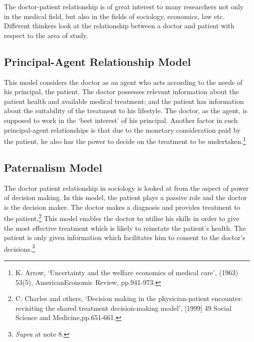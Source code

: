 \begin{multicols}{2}

\noi
The doctor-patient relationship is of great interest to many researchers not only in the
medical field, but also in the fields of sociology, economics, law etc. Different thinkers
look at the relationship between a doctor and patient with respect to the area of study.

\vspace{-.4cm}

\subsection*{Principal-Agent Relationship Model}

\vspace{-.2cm}

\noi
This model considers the doctor as an agent who acts according to the needs of his
principal, the patient. The doctor possesses relevant information about the patient health
and available medical treatment; and the patient has information about the suitability of
the treatment to his lifestyle. The doctor, as the agent, is supposed to work in the ‘best
interest’ of his principal. Another factor in such principal-agent relationships is that due
to the monetary consideration paid by the patient, he also has the power to decide on the
treatment to be undertaken.\footnote{K. Arrow, ‘Uncertainty and the welfare economics of medical care’, (1963) 53(5), AmericanEconomic Review, pp.941-973.}

\vspace{-.4cm}

\subsection*{Paternalism Model}

\vspace{-.2cm}
\noi
The doctor patient relationship in sociology is looked at from the aspect of power of
decision making. In this model, the patient plays a passive role and the doctor is the
decision maker. The doctor makes a diagnosis and provides treatment to the
patient.\footnote{C. Charles and others, ‘Decision making in the physician-patient encounter: revisiting the shared treatment decision-making model’, [1999] 49 Social Science and Medicine,pp.651-661.} This model enables the doctor to utilise his skills in order to give the most effective treatment which is likely to reinstate the patient's health. The patient is only given information which facilitates him to consent to the doctor's decisions.\footnote{\textit{Supra} at note 8.}


\end{multicols}
